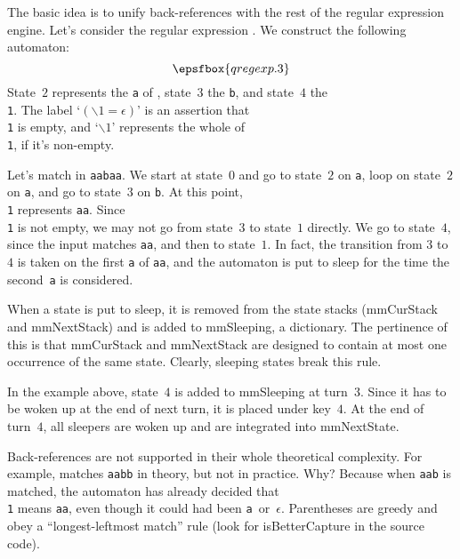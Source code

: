 The basic idea is to unify back-references with the rest of the regular expression engine.  Let's consider the regular expression .  We construct the following automaton:  $$\epsfbox{qregexp.3}$$  State~$2$ represents the {\tt a} of , state~$3$ the {\tt b}, and state~$4$ the {\tt \\1}.  The label `$(\backslash1 = \epsilon)$' is an assertion that {\tt \\1} is empty, and `$\backslash1$' represents the whole of {\tt \\1}, if it's non-empty.

Let's match  in {\tt aabaa}.  We start at state~$0$ and go to state~$2$ on {\tt a}, loop on state~$2$ on {\tt a}, and go to state~$3$ on {\tt b}.  At this point, {\tt \\1} represents {\tt aa}.  Since {\tt \\1} is not empty, we may not go from state~$3$ to state~$1$ directly.  We go to state~$4$, since the input matches {\tt aa}, and then to state~$1$.  In fact, the transition from $3$ to $4$ is taken on the first {\tt a} of {\tt aa}, and the automaton is put to sleep for the time the second~{\tt a} is considered.

When a state is put to sleep, it is removed from the state stacks ({\sf mmCurStack} and {\sf mmNextStack}) and is added to {\sf mmSleeping}, a dictionary.  The pertinence of this is that {\sf mmCurStack} and {\sf mmNextStack} are designed to contain at most one occurrence of the same state.  Clearly, sleeping states break this rule.

In the example above, state~$4$ is added to {\sf mmSleeping} at turn~$3$.  Since it has to be woken up at the end of next turn, it is placed under key~$4$.  At the end of turn~$4$, all sleepers are woken up and are integrated into {\sf mmNextState}.

Back-references are not supported in their whole theoretical complexity.  For example,  matches {\tt aabb} in theory, but not in practice.  Why?  Because when {\tt aab} is matched, the automaton has already decided that {\tt \\1} means {\tt aa}, even though it could had been {\tt a}~or~$\epsilon$.  Parentheses are greedy and obey a ``longest-leftmost match'' rule (look for {\sf isBetterCapture} in the source code).

\bye
